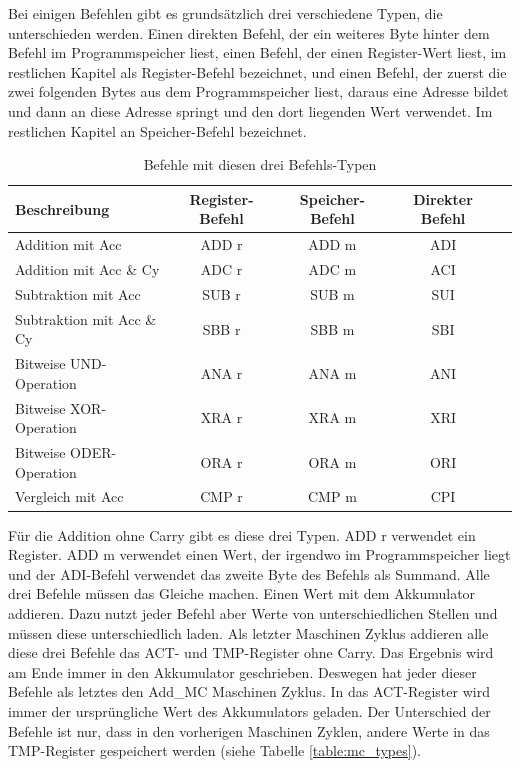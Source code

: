 \documentclass[12pt]{article}
\newcommand{\imgSpaceBefore}{\\[0.2cm]}
\begin{document}
\noindent
Bei einigen Befehlen gibt es grundsätzlich drei verschiedene Typen, die unterschieden werden. Einen direkten Befehl, der ein weiteres Byte hinter dem Befehl im Programmspeicher liest, einen Befehl, der einen Register-Wert liest, im restlichen Kapitel als Register-Befehl bezeichnet, und einen Befehl, der zuerst die zwei folgenden Bytes aus dem Programmspeicher liest, daraus eine Adresse bildet und dann an diese Adresse springt und den dort liegenden Wert verwendet. Im restlichen Kapitel an Speicher-Befehl bezeichnet.
\imgSpaceBefore
\begin{table}[H]
\centering
\caption{Befehle mit diesen drei Befehls-Typen}
\label{table:instr_types}
\begin{tabular}{|l|c|c|c|c| } 
 \hline
 Beschreibung & Register-Befehl & Speicher-Befehl & Direkter Befehl \\
 \hline 
 Addition mit Acc & ADD r & ADD m & ADI \\ 
 Addition mit Acc \& Cy & ADC r & ADC m & ACI \\ 
 Subtraktion mit Acc & SUB r & SUB m & SUI \\ 
 Subtraktion mit Acc \& Cy & SBB r & SBB m & SBI \\ 
 Bitweise UND-Operation & ANA r & ANA m & ANI \\ 
 Bitweise XOR-Operation & XRA r & XRA m & XRI \\ 
 Bitweise ODER-Operation & ORA r & ORA m & ORI \\ 
 Vergleich mit Acc & CMP r & CMP m & CPI \\ 
 \hline
\end{tabular}
\end{table}

\noindent
Für die Addition ohne Carry gibt es diese drei Typen. ADD r verwendet ein Register. ADD m verwendet einen Wert, der irgendwo im Programmspeicher liegt und der ADI-Befehl verwendet das zweite Byte des Befehls als Summand. Alle drei Befehle müssen das Gleiche machen. Einen Wert mit dem Akkumulator addieren. Dazu nutzt jeder Befehl aber Werte von unterschiedlichen Stellen und müssen diese unterschiedlich laden. 
Als letzter Maschinen Zyklus addieren alle diese drei Befehle das ACT- und TMP-Register ohne Carry. Das Ergebnis wird am Ende immer in den Akkumulator geschrieben. Deswegen hat jeder dieser Befehle als letztes den Add\_MC Maschinen Zyklus. 
In das ACT-Register wird immer der ursprüngliche Wert des Akkumulators geladen. Der Unterschied der Befehle ist nur, dass in den vorherigen Maschinen Zyklen, andere Werte in das TMP-Register gespeichert werden (siehe Tabelle \ref{table:mc_types}). 
\\
\end{document}
